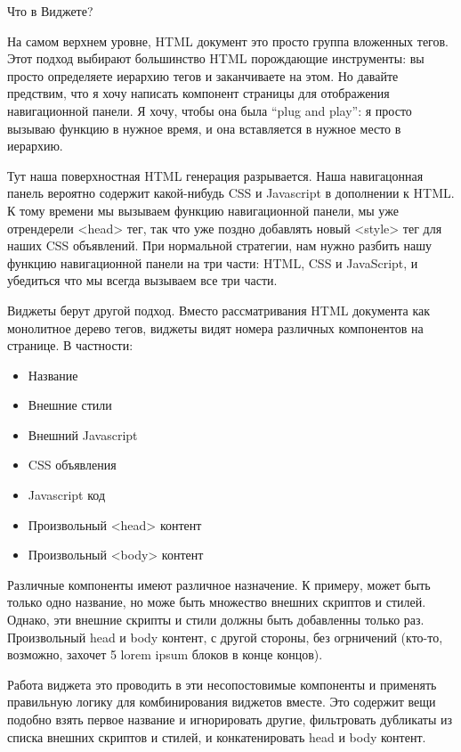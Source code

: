 Что в Виджете?

На самом верхнем уровне, HTML документ это просто группа вложенных тегов. Этот подход выбирают большинство HTML порождающие инструменты: вы просто определяете иерархию тегов и заканчиваете на этом. Но давайте предствим, что я хочу написать компонент страницы для отображения навигационной панели. Я хочу, чтобы она была \textquotedblleft plug and play\textquotedblright: я просто вызываю функцию в нужное время, и она вставляется в нужное место в иерархию.

Тут наша поверхностная HTML генерация разрывается. Наша навигацонная панель вероятно содержит какой-нибудь CSS и Javascript в дополнении к HTML. К тому времени мы вызываем функцию навигационной панели, мы уже отрендерели <head> тег, так что уже поздно добавлять новый <style> тег для наших CSS объявлений. При нормальной стратегии, нам нужно разбить нашу функцию навигационной панели на три части: HTML, CSS и JavaScript, и убедиться что мы всегда вызываем все три части.  

Виджеты берут другой подход. Вместо рассматривания HTML документа как монолитное дерево тегов, виджеты видят номера различных компонентов на странице. В частности:

\begin{itemize}
  \item Название
  \item Внешние стили
  \item Внешний Javascript
  \item CSS объявления
  \item Javascript код
  \item Произвольный <head> контент
  \item Произвольный <body> контент
\end{itemize}

Различные компоненты имеют различное назначение. К примеру, может быть только одно название, но може быть множество внешних скриптов и стилей. Однако, эти внешние скрипты и стили должны быть добавленны только раз. Произвольный head и body контент, с другой стороны, без огрничений (кто-то, возможно, захочет 5 lorem ipsum блоков в конце концов).

Работа виджета это проводить в эти несопостовимые компоненты и применять правильную логику для комбинирования виджетов вместе. Это содержит вещи подобно взять первое название и игнорировать другие, фильтровать дубликаты из списка внешних скриптов и стилей, и конкатенировать head и body контент.

